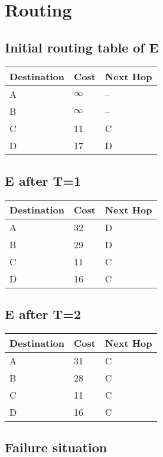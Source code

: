 \section{Routing}
\subsection{Initial routing table of E}
\begin{tabular}{| l | l | l |}
    \hline
    Destination & Cost & Next Hop \\ \hline
    A & \cellcolor{red}$\infty$ & -- \\ \hline
    B & \cellcolor{red}$\infty$ & -- \\ \hline
    C & 11 & C \\ \hline
    D & 17 & D \\ \hline
\end{tabular}
\subsection{E after T=1}
\begin{tabular}{| l | l | l |}
    \hline
    Destination & Cost & Next Hop \\ \hline
    A & 32 & D \\ \hline
    B & 29 & D \\ \hline
    C & 11 & C \\ \hline
    D & 16 & C \\ \hline
\end{tabular}
\subsection{E after T=2}
\begin{tabular}{| l | l | l |}
    \hline
    Destination & Cost & Next Hop \\ \hline
    A & 31 & C \\ \hline
    B & 28 & C \\ \hline
    C & 11 & C \\ \hline
    D & 16 & C \\ \hline
\end{tabular}
\subsection{Failure situation}

